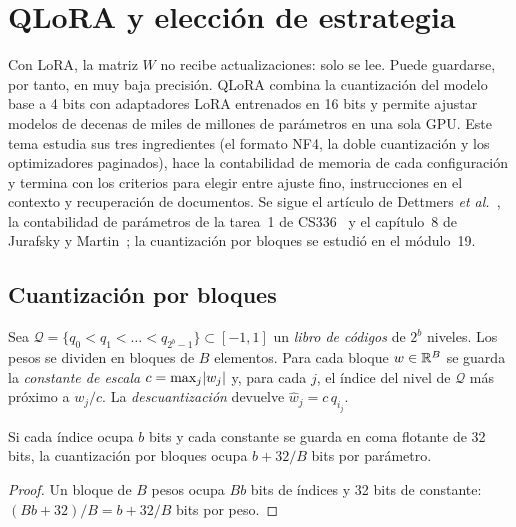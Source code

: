 \chapter{QLoRA y elección de estrategia}
\label{tema:6}

Con LoRA, la matriz $W$ no recibe actualizaciones: solo se lee. Puede guardarse, por tanto, en muy baja precisión. QLoRA combina la cuantización del modelo base a 4 bits con adaptadores LoRA entrenados en 16 bits y permite ajustar modelos de decenas de miles de millones de parámetros en una sola GPU. Este tema estudia sus tres ingredientes (el formato NF4, la doble cuantización y los optimizadores paginados), hace la contabilidad de memoria de cada configuración y termina con los criterios para elegir entre ajuste fino, instrucciones en el contexto y recuperación de documentos. Se sigue el artículo de Dettmers \emph{et al.}~\cite[§3 y~§4]{dettmers}, la contabilidad de parámetros de la tarea~1 de CS336~\cite[§3.5]{cs336a1} y el capítulo~8 de Jurafsky y Martin~\cite{jm3}; la cuantización por bloques se estudió en el módulo~19.

\section{Cuantización por bloques}

\begin{definicion}\label{def:cuant-bloques}
Sea $\mathcal{Q}=\{q_0<q_1<\dots<q_{2^{b}-1}\}\subset[-1,1]$ un \emph{libro de códigos} de $2^{b}$ niveles. Los pesos se dividen en bloques de $B$ elementos. Para cada bloque $w\in\mathbb{R}^{B}$ se guarda la \emph{constante de escala} $c=\max_j\lvert w_j\rvert$ y, para cada $j$, el índice del nivel de $\mathcal{Q}$ más próximo a $w_j/c$. La \emph{descuantización} devuelve $\hat w_j=c\,q_{i_j}$.
\end{definicion}

\begin{proposicion}\label{prop:bits}
Si cada índice ocupa $b$ bits y cada constante se guarda en coma flotante de 32 bits, la cuantización por bloques ocupa $b+32/B$ bits por parámetro.
\end{proposicion}

\begin{proof}
Un bloque de $B$ pesos ocupa $Bb$ bits de índices y 32 bits de constante: $(Bb+32)/B=b+32/B$ bits por peso.
\end{proof}

